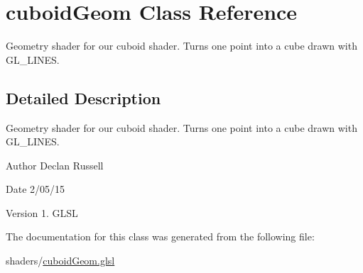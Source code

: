 \hypertarget{classcuboid_geom}{\section{cuboid\-Geom Class Reference}
\label{classcuboid_geom}
}


Geometry shader for our cuboid shader. Turns one point into a cube drawn with G\-L\-\_\-\-L\-I\-N\-E\-S.  




\subsection{Detailed Description}
Geometry shader for our cuboid shader. Turns one point into a cube drawn with G\-L\-\_\-\-L\-I\-N\-E\-S. 

\begin{DoxyAuthor}{Author}
Declan Russell 
\end{DoxyAuthor}
\begin{DoxyDate}{Date}
2/05/15 
\end{DoxyDate}
\begin{DoxyVersion}{Version}
1.  G\-L\-S\-L 
\end{DoxyVersion}


The documentation for this class was generated from the following file\-:\begin{DoxyCompactItemize}
\item 
shaders/\hyperlink{cuboid_geom_8glsl}{cuboid\-Geom.\-glsl}\end{DoxyCompactItemize}
